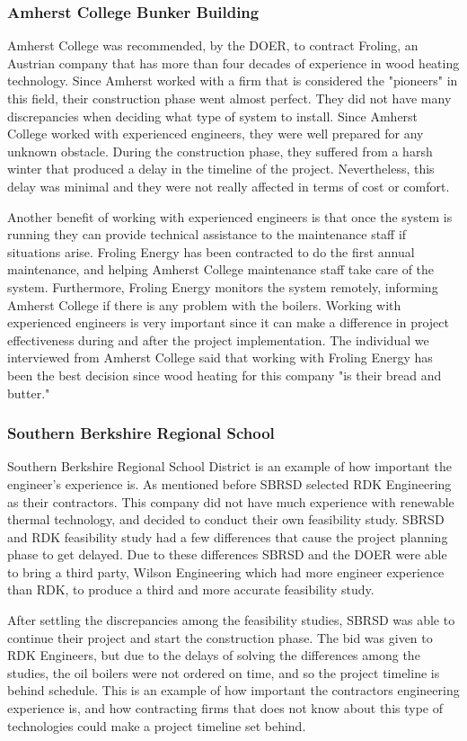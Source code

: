 \subsubsection{Amherst College Bunker Building}
\par Amherst College was recommended, by the DOER, to contract Froling, an Austrian company that has more than four decades of experience in wood heating technology. Since Amherst worked with a firm that is considered the "pioneers" in this field, their construction phase went almost perfect. They did not have many discrepancies when deciding what type of system to install. Since Amherst College worked with experienced engineers, they were well prepared for any unknown obstacle. During the construction phase, they suffered from a harsh winter that produced a delay in the timeline of the project. Nevertheless, this delay was minimal and they were not really affected in terms of cost or comfort.
\par Another benefit of working with experienced engineers is that once the system is running they can provide technical assistance to the maintenance staff if situations arise. Froling Energy has been contracted to do the first annual maintenance, and helping Amherst College maintenance staff take care of the system. Furthermore, Froling Energy monitors the system remotely, informing Amherst College if there is any problem with the boilers. Working with experienced engineers is very important since it can make a difference in project effectiveness during and after the project implementation. The individual we interviewed from Amherst College said that working with Froling Energy has been the best decision since wood heating for this company "is their bread and butter."

\subsubsection{Southern Berkshire Regional School}
\par Southern Berkshire Regional School District is an example of how important the engineer's experience is. As mentioned before SBRSD selected RDK Engineering as their contractors. This company did not have much experience with renewable thermal technology, and decided to conduct their own feasibility study. SBRSD and RDK feasibility study had a few differences that cause the project planning phase to get delayed. Due to these differences SBRSD and the DOER were able to bring a third party, Wilson Engineering which had more engineer experience than RDK, to produce a third and more accurate feasibility study.
\par After settling the discrepancies among the feasibility studies, SBRSD was able to continue their project and start the construction phase. The bid was given to RDK Engineers, but due to the delays of solving the differences among the studies, the oil boilers were not ordered on time, and so the project timeline is behind schedule. This is an example of how important the contractors engineering experience is, and how contracting firms that does not know about this type of technologies could make a project timeline set behind.

